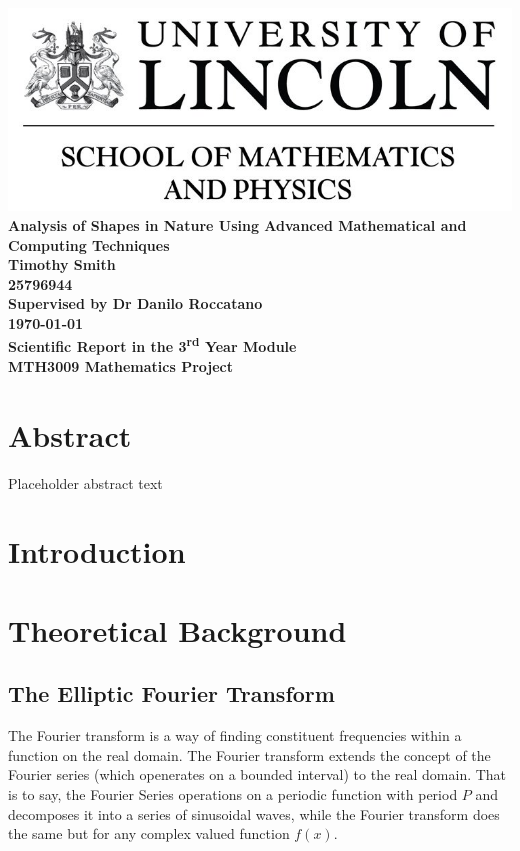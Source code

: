 \documentclass[12pt,english]{article}
\begin{document}
\begin{center}
\includegraphics[scale = 0.5]{LincolnLogo}
\newline\newline
\thispagestyle{empty}
    \textbf{\huge{Analysis of Shapes in Nature Using Advanced Mathematical and Computing Techniques} \\
    [100pt] \Large{Timothy Smith\\25796944} \\
    [40pt]\LARGE{Supervised by Dr Danilo Roccatano}\\
    [50pt]\today \\
	[40pt]Scientific Report in the 3\textsuperscript{rd} Year Module\\ MTH3009 Mathematics Project  }
\end{center}

\newpage
\section*{Abstract}
Placeholder abstract text

\newpage
\tableofcontents

\newpage
\section{Introduction}

\section{Theoretical Background}
\subsection{The Elliptic Fourier Transform}
The Fourier transform is a way of finding constituent frequencies within a function on the real domain.
The Fourier transform extends the concept of the Fourier series (which openerates on a bounded interval) to the real
domain.
That is to say, the Fourier Series operations on a periodic function with period
$P$ and decomposes it into a series of sinusoidal waves, while the Fourier transform
does the same but for any complex valued function $f(x)$.
\end{document}
